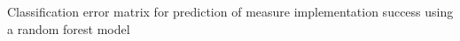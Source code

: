 Classification error matrix for prediction of measure implementation success using a random forest model
\label{fig:measureimplementation_classification}